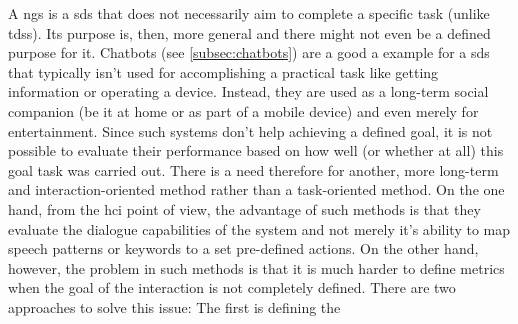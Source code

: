 A \acf{ngs} is a \ac{sds} that does not necessarily aim to complete a specific task (unlike \acp{tds}).
Its purpose is, then, more general and there might not even be a defined purpose for it.
Chatbots (see \cref{subsec:chatbots}) are a good a example for a \ac{sds} that typically isn't used for accomplishing a practical task like getting information or operating a device.
Instead, they are used as a long-term social companion (be it at home or as part of a mobile device) and even merely for entertainment. 
Since such systems don't help achieving a defined goal, it is not possible to evaluate their performance based on how well (or whether at all) this goal task was carried out.
There is a need therefore for another, more long-term and interaction-oriented method rather than a task-oriented method.
On the one hand, from the \ac{hci} point of view, the advantage of such methods is that they evaluate the dialogue capabilities of the system and not merely it's ability to map speech patterns or keywords to a set pre-defined actions.
On the other hand, however, the problem in such methods is that it is much harder to define metrics when the goal of the interaction is not completely defined.
There are two approaches to solve this issue:
The first is defining the 
